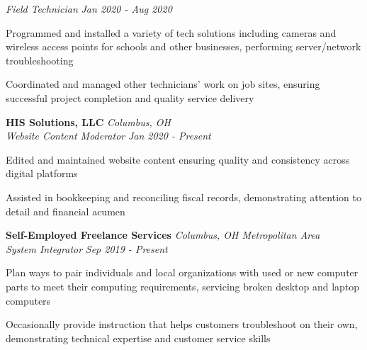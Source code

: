 \documentclass[letterpaper]{article}
\begin{document}
    \textit{Field Technician} \hfill \textsl{Jan 2020 - Aug 2020}\\
    \vspace{-7pt}
    \begin{tightitemize} \itemsep -1mm
        
            \item Programmed and installed a variety of tech solutions including cameras and wireless access points for schools and other businesses, performing server/network troubleshooting
            
            \item Coordinated and managed other technicians' work on job sites, ensuring successful project completion and quality service delivery

    \end{tightitemize}
    \vspace{-2mm}

    \textbf{HIS Solutions, LLC} \hfill \textsl{Columbus, OH}\\
    
    \textit{Website Content Moderator} \hfill \textsl{Jan 2020 - Present}\\
    \vspace{-7pt}
    \begin{tightitemize} \itemsep -1mm
        
            \item Edited and maintained website content ensuring quality and consistency across digital platforms
            
            \item Assisted in bookkeeping and reconciling fiscal records, demonstrating attention to detail and financial acumen

    \end{tightitemize}
    \vspace{-2mm}

    \textbf{Self-Employed Freelance Services} \hfill \textsl{Columbus, OH Metropolitan Area}\\
    
    \textit{System Integrator} \hfill \textsl{Sep 2019 - Present}\\
    \vspace{-7pt}
    \begin{tightitemize} \itemsep -1mm
        
            \item Plan ways to pair individuals and local organizations with used or new computer parts to meet their computing requirements, servicing broken desktop and laptop computers
            
            \item Occasionally provide instruction that helps customers troubleshoot on their own, demonstrating technical expertise and customer service skills

    \end{tightitemize}
    \vspace{-2mm}
    
\end{document}
